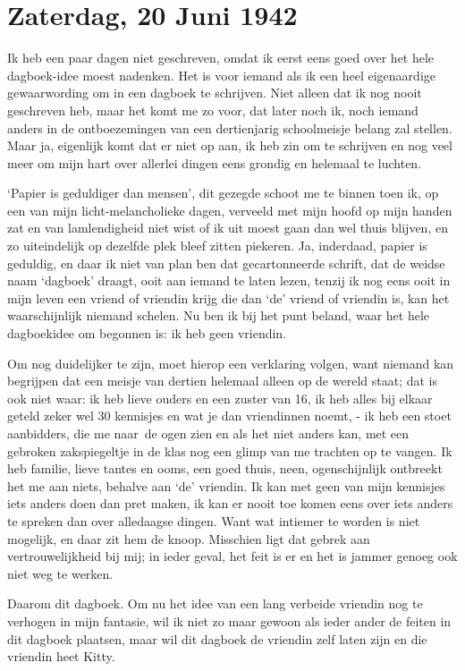 \documentclass{book}
\begin{document}
\section*{Zaterdag, 20 Juni 1942}

Ik heb een paar dagen niet geschreven, omdat ik eerst eens goed over het hele
dagboek-idee moest nadenken. Het is voor iemand als ik een heel eigenaardige
gewaarwording om in een dagboek te schrijven. Niet alleen dat ik nog nooit
geschreven heb, maar het komt me zo voor, dat later noch ik, noch iemand anders
in de ontboezemingen van een dertienjarig schoolmeisje belang zal stellen. Maar
ja, eigenlijk komt dat er niet op aan, ik heb zin om te schrijven en nog veel
meer om mijn hart over allerlei dingen eens grondig en helemaal te luchten.

`Papier is geduldiger dan mensen', dit gezegde schoot me te binnen toen ik, op
een van mijn licht-melancholieke dagen, verveeld met mijn hoofd op mijn handen
zat en van lamlendigheid niet wist of ik uit moest gaan dan wel thuis blijven,
en zo uiteindelijk op dezelfde plek bleef zitten piekeren. Ja, inderdaad, papier
is geduldig, en daar ik niet van plan ben dat gecartonneerde schrift, dat de
weidse naam `dagboek' draagt, ooit aan iemand te laten lezen, tenzij ik nog eens
ooit in mijn leven een vriend of vriendin krijg die dan `de' vriend of vriendin
is, kan het waarschijnlijk niemand schelen. Nu ben ik bij het punt beland, waar
het hele dagboekidee om begonnen is: ik heb geen vriendin.

Om nog duidelijker te zijn, moet hierop een verklaring volgen, want niemand kan
begrijpen dat een meisje van dertien helemaal alleen op de wereld staat; dat is
ook niet waar: ik heb lieve ouders en een zuster van 16, ik heb alles bij elkaar
geteld zeker wel 30 kennisjes en wat je dan vriendinnen noemt, - ik heb een
stoet aanbidders, die me naar~de ogen zien en als het niet anders kan, met een
gebroken zakspiegeltje in de klas nog een glimp van me trachten op te vangen. Ik
heb familie, lieve tantes en ooms, een goed thuis, neen, ogenschijnlijk
ontbreekt het me aan niets, behalve aan `de' vriendin. Ik kan met geen van mijn
kennisjes iets anders doen dan pret maken, ik kan er nooit toe komen eens over
iets anders te spreken dan over alledaagse dingen. Want wat intiemer te worden
is niet mogelijk, en daar zit hem de knoop. Misschien ligt dat gebrek aan
vertrouwelijkheid bij mij; in ieder geval, het feit is er en het is jammer
genoeg ook niet weg te werken.

Daarom dit dagboek. Om nu het idee van een lang verbeide vriendin nog te
verhogen in mijn fantasie, wil ik niet zo maar gewoon als ieder ander de feiten
in dit dagboek plaatsen, maar wil dit dagboek de vriendin zelf laten zijn en die
vriendin heet Kitty.
\end{document}

